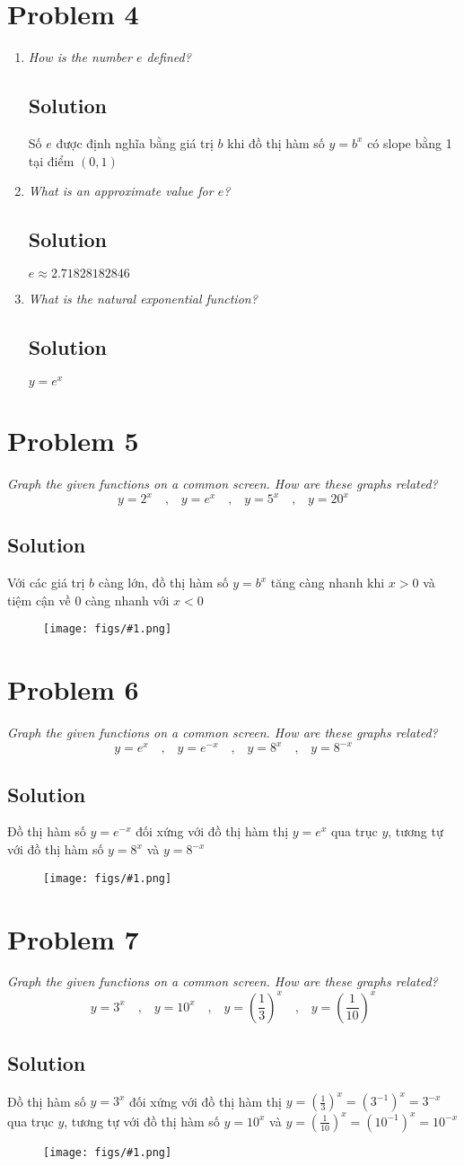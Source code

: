 \documentclass[11pt]{article}
\newcommand{\soln}{\subsection*}
\newcommand{\qn}{\textit}
\newcommand{\imgsoln}[1]{
	\begin{figure}[H]
		\centering
		\texttt{[image: figs/\#1.png]}
	\end{figure}
}
\newcommand{\eqtext}[1]{\quad\text{#1}\quad}
\begin{document}
\section*{Problem 4}

\begin{enumerate}
	\item \qn{How is the number $e$ defined?}
	\soln{Solution}
	Số $e$ được định nghĩa bằng giá trị $b$ khi đồ thị hàm số $y=b^x$ có slope bằng 1 tại điểm $(0,1)$
	
	\item \qn{What is an approximate value for $e$?}
	\soln{Solution}
	$e \approx 2.71828182846$
	
	\item \qn{What is the natural exponential function?}
	\soln{Solution}
	$y=e^x$
\end{enumerate}

\section*{Problem 5}

\qn{Graph the given functions on a common screen. How are these graphs related? $$y=2^x \eqtext{,} y=e^x \eqtext{,} y=5^x \eqtext{,} y=20^x$$}

\soln{Solution}
Với các giá trị $b$ càng lớn, đồ thị hàm số $y=b^x$ tăng càng nhanh khi $x>0$ và tiệm cận về 0 càng nhanh với $x<0$
\imgsoln{1.4.5-ans}

\section*{Problem 6}

\qn{Graph the given functions on a common screen. How are these graphs related? $$y=e^x \eqtext{,} y=e^{-x} \eqtext{,} y=8^x \eqtext{,} y=8^{-x}$$}

\soln{Solution}
Đồ thị hàm số $y=e^{-x}$ đối xứng với đồ thị hàm thị $y=e^x$ qua trục $y$, tương tự với đồ thị hàm số $y=8^x$ và $y=8^{-x}$
\imgsoln{1.4.6-ans} 

\section*{Problem 7}

\qn{Graph the given functions on a common screen. How are these graphs related? $$y=3^x \eqtext{,} y=10^x \eqtext{,} y=(\frac{1}{3})^x \eqtext{,} y=(\frac{1}{10})^x$$}

\soln{Solution}
Đồ thị hàm số $y=3^x$ đối xứng với đồ thị hàm thị $y=(\frac{1}{3})^x=(3^{-1})^x=3^{-x}$ qua trục $y$, tương tự với đồ thị hàm số $y=10^x$ và $y=(\frac{1}{10})^x=(10^{-1})^x=10^{-x}$
\imgsoln{1.4.7-ans}
\end{document}

